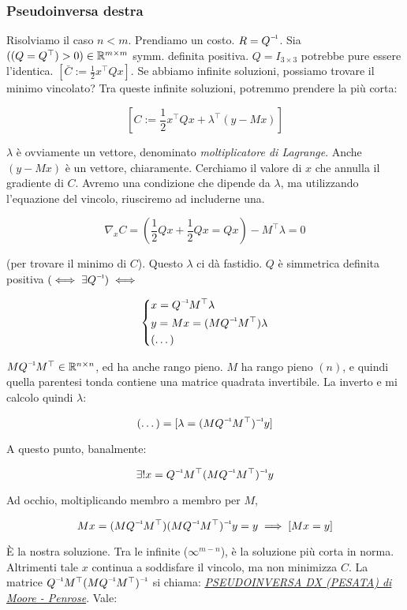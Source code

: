 \subsubsection{Pseudoinversa destra}

Risolviamo il caso $n<m$. Prendiamo un costo. $R=\inv{Q}$. Sia $((Q=Q^\top)>0)\in\mathbb{R}^{m\times m}$ symm. definita positiva. $Q=I_{3\times 3}$ potrebbe pure essere l'identica. $[\bar{C}:=\frac{1}{2}x^\top Qx]$. Se abbiamo infinite soluzioni, possiamo trovare il minimo vincolato? Tra queste infinite soluzioni, potremmo prendere la più corta:

\[
	[C := \frac{1}{2}x^\top Qx + \lambda^\top(y-Mx)]
\]

$\lambda$ è ovviamente un vettore, denominato \textit{moltiplicatore di Lagrange}. Anche $(y-Mx)$ è un vettore, chiaramente. Cerchiamo il valore di $x$ che annulla il gradiente di $C$. Avremo una condizione che dipende da $\lambda$, ma utilizzando l'equazione del vincolo, riusciremo ad includerne una.

\[
	\nabla_x{C} = (\frac{1}{2}Qx + \frac{1}{2}Qx = Qx) - M^\top\lambda = 0
\]

(per trovare il minimo di $C$). Questo $\lambda$ ci dà fastidio. $Q$ è simmetrica definita positiva $(\iff\exists\inv{Q}) \iff$

\[
	\left\{
	\begin{aligned}
	&x = \inv{Q}M^\top\lambda\\
	&y=Mx=(M\inv{Q}M^\top)\lambda\\
	&(\dots)
	\end{aligned}
	\right.
\]

$M\inv{Q}M^\top\in\R^{n\times n}$, ed ha anche rango pieno. $M$ ha rango pieno $(n)$, e quindi quella parentesi tonda contiene una matrice quadrata invertibile. La inverto e mi calcolo quindi $\lambda$:

\[	
	(\dots) = [\lambda = \inv{(M\inv{Q}M^\top)}y]
\]

A questo punto, banalmente:

\[
	\exists! x = \inv{Q}M^\top\inv{(M\inv{Q}M^\top)}y
\]

Ad occhio, moltiplicando membro a membro per $M$,

\[
	Mx = (M\inv{Q}M^\top)\inv{(M\inv{Q}M^\top)}y = y \implies [Mx=y]
\]

\`E la nostra soluzione. Tra le infinite ($\infty^{m-n}$), è la soluzione più corta in norma. Altrimenti tale $x$ continua a soddisfare il vincolo, ma non minimizza $C$. La matrice $\inv{Q}M^\top\inv{(M\inv{Q}M^\top)}$ si chiama: \textit{\underline{\underline{PSEUDOINVERSA DX} (PESATA) di Moore - Penrose}}. Vale:

